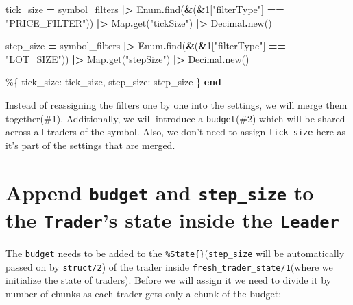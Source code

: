 \documentclass[
]{book}
\newenvironment{Shaded}{\begin{snugshade}}{\end{snugshade}}
\newcommand{\ConstantTok}[1]{\textcolor[rgb]{0.00,0.00,0.00}{#1}}
\newcommand{\DecValTok}[1]{\textcolor[rgb]{0.00,0.00,0.81}{#1}}
\newcommand{\KeywordTok}[1]{\textcolor[rgb]{0.13,0.29,0.53}{\textbf{#1}}}
\newcommand{\NormalTok}[1]{#1}
\newcommand{\OperatorTok}[1]{\textcolor[rgb]{0.81,0.36,0.00}{\textbf{#1}}}
\newcommand{\StringTok}[1]{\textcolor[rgb]{0.31,0.60,0.02}{#1}}
\newcommand{\VariableTok}[1]{\textcolor[rgb]{0.00,0.00,0.00}{#1}}
\begin{document}
\begin{Shaded}
\begin{Highlighting}[]
\NormalTok{    tick\_size }\OperatorTok{=}
\NormalTok{      symbol\_filters}
      \OperatorTok{|\textgreater{}} \ConstantTok{Enum}\OperatorTok{.}\NormalTok{find(}\OperatorTok{\&}\NormalTok{(}\OperatorTok{\&}\DecValTok{1}\NormalTok{[}\StringTok{"filterType"}\NormalTok{] }\OperatorTok{==} \StringTok{"PRICE\_FILTER"}\NormalTok{))}
      \OperatorTok{|\textgreater{}} \ConstantTok{Map}\OperatorTok{.}\NormalTok{get(}\StringTok{"tickSize"}\NormalTok{)}
      \OperatorTok{|\textgreater{}} \ConstantTok{Decimal}\OperatorTok{.}\NormalTok{new()}

\NormalTok{    step\_size }\OperatorTok{=}
\NormalTok{      symbol\_filters}
      \OperatorTok{|\textgreater{}} \ConstantTok{Enum}\OperatorTok{.}\NormalTok{find(}\OperatorTok{\&}\NormalTok{(}\OperatorTok{\&}\DecValTok{1}\NormalTok{[}\StringTok{"filterType"}\NormalTok{] }\OperatorTok{==} \StringTok{"LOT\_SIZE"}\NormalTok{))}
      \OperatorTok{|\textgreater{}} \ConstantTok{Map}\OperatorTok{.}\NormalTok{get(}\StringTok{"stepSize"}\NormalTok{)}
      \OperatorTok{|\textgreater{}} \ConstantTok{Decimal}\OperatorTok{.}\NormalTok{new()}

\NormalTok{    \%\{}
      \VariableTok{tick\_size:}\NormalTok{ tick\_size,}
      \VariableTok{step\_size:}\NormalTok{ step\_size}
\NormalTok{    \}}
  \KeywordTok{end}
\end{Highlighting}
\end{Shaded}

Instead of reassigning the filters one by one into the settings, we will merge them together(\#1). Additionally, we will introduce a \texttt{budget}(\#2) which will be shared across all traders of the symbol. Also, we don't need to assign \texttt{tick\_size} here as it's part of the settings that are merged.

\hypertarget{append-budget-and-step_size-to-the-traders-state-inside-the-leader}{%
\section{\texorpdfstring{Append \texttt{budget} and \texttt{step\_size} to the \texttt{Trader}'s state inside the \texttt{Leader}}{Append budget and step\_size to the Trader's state inside the Leader}}\label{append-budget-and-step_size-to-the-traders-state-inside-the-leader}}

The \texttt{budget} needs to be added to the \texttt{\%State\{\}}(\texttt{step\_size} will be automatically passed on by \texttt{struct/2}) of the trader inside \texttt{fresh\_trader\_state/1}(where we initialize the state of traders). Before we will assign it we need to divide it by number of chunks as each trader gets only a chunk of the budget:
\end{document}
